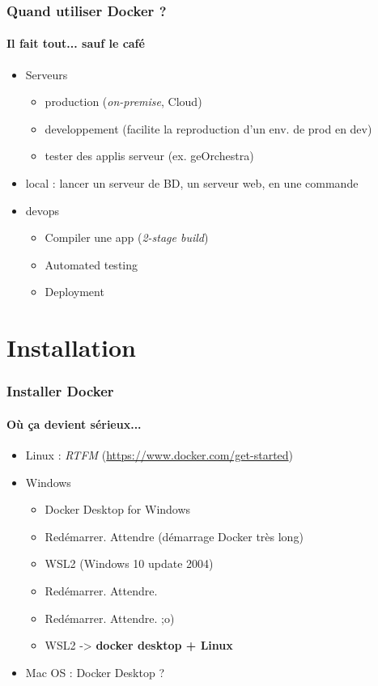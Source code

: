 \documentclass[11pt]{beamer}
\begin{document}
\begin{frame}
\frametitle{Quand utiliser Docker ?}
\framesubtitle{Il fait tout... sauf le café}
\begin{itemize}
	\item Serveurs
	\begin{itemize}
		\item production (\textit{on-premise}, Cloud)
		\item developpement (facilite la reproduction d'un env. de prod en dev)
		\item tester des applis serveur (ex. geOrchestra)
	\end{itemize}
	\item local : lancer un serveur de BD, un serveur web, en une commande
	\item devops
	\begin{itemize}
		\item Compiler une app (\textit{2-stage build})
		\item Automated testing
		\item Deployment
	\end{itemize}
\end{itemize}
\end{frame}

\section{Installation}

\begin{frame}
\frametitle{Installer Docker}
\framesubtitle{Où ça devient sérieux...}
\begin{itemize}
	\item Linux : \textit{RTFM} (\url{https://www.docker.com/get-started})
	\item Windows
	\begin{itemize}
		\item Docker Desktop for Windows
		\item Redémarrer. Attendre (démarrage Docker très long)
		\item WSL2 (Windows 10 update 2004)
		\item Redémarrer. Attendre.
		\item Redémarrer. Attendre.   ;o)
		\item WSL2  -> \textbf{docker desktop + Linux}
	\end{itemize}
	\item Mac OS : Docker Desktop ?
\end{itemize}
\end{frame}
\end{document}
